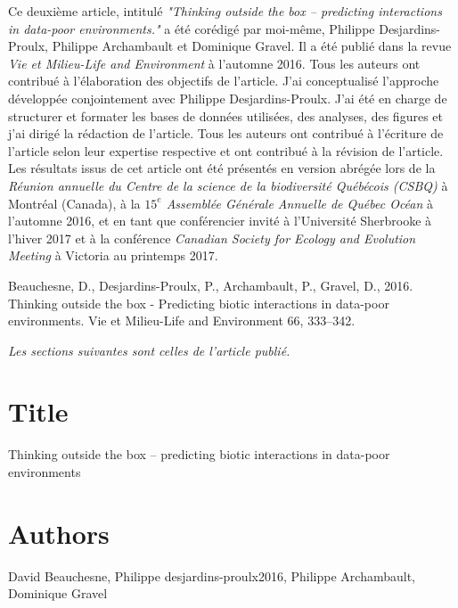 Ce deuxième article, intitulé \textit{"Thinking outside the box – predicting interactions in data-poor environments."} a été corédigé par moi-même, Philippe Desjardins-Proulx, Philippe Archambault et Dominique Gravel. Il a été publié dans la revue \textit{Vie et Milieu-Life and Environment} à l'automne 2016. Tous les auteurs ont contribué à l'élaboration des objectifs de l'article. J'ai conceptualisé l'approche développée conjointement avec Philippe Desjardins-Proulx. J'ai été en charge de structurer et formater les bases de données utilisées, des analyses, des figures et j'ai dirigé la rédaction de l'article. Tous les auteurs ont contribué à l'écriture de l'article selon leur expertise respective et ont contribué à la révision de l'article. Les résultats issus de cet article ont été présentés en version abrégée lors de la \textit{Réunion annuelle du Centre de la science de la biodiversité Québécois (CSBQ)} à Montréal (Canada), à la \textit{$15^e$ Assemblée Générale Annuelle de Québec Océan} à l'automne 2016, et en tant que conférencier invité à l'Université Sherbrooke à l'hiver 2017 et à la conférence \textit{Canadian Society for Ecology and Evolution Meeting} à Victoria au printemps 2017. \linebreak[4]


\begin{singlespace}
  Beauchesne, D., Desjardins-Proulx, P., Archambault, P., Gravel, D., 2016. Thinking outside the box - Predicting biotic interactions in data-poor environments. Vie et Milieu-Life and Environment 66, 333–342.
\end{singlespace}


\textit{Les sections suivantes sont celles de l’article publié.}


\section{Title}

Thinking outside the box – predicting biotic interactions in data-poor environments

\section{Authors}

David Beauchesne, Philippe desjardins-proulx2016, Philippe Archambault, Dominique Gravel

